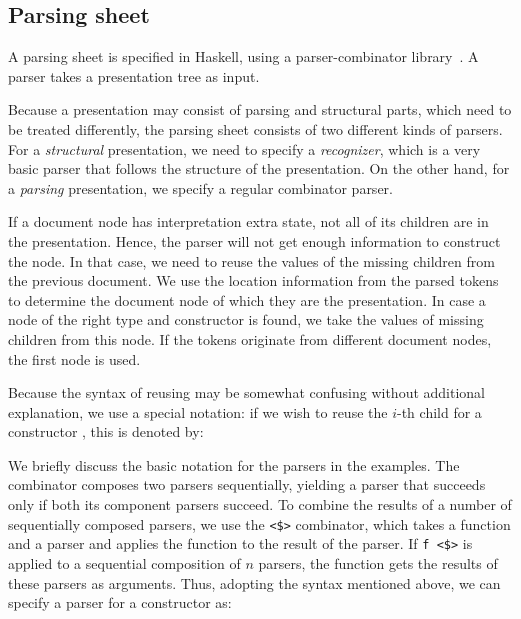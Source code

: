 \subsection{Parsing sheet}

A parsing sheet is specified in Haskell, using a parser-combinator library~\cite{swierstra01parsers}. A parser takes a presentation tree as input.

Because a presentation may consist of parsing and structural parts, which need to be treated differently, the parsing sheet consists of two different kinds of parsers. For a {\em structural} presentation, we need to specify a {\em recognizer}, which is a very basic parser that follows the structure of the presentation. On the other hand, for a {\em parsing} presentation, we specify a regular combinator parser. 

If a document node has interpretation extra state, not all of its children are in the presentation. Hence, the parser will not get enough information to construct the node. In that case, we need to reuse the values of the missing children from the previous document. We use the location information from the parsed tokens to determine the document node of which they are the presentation. In case a node of the right type and constructor is found, we take the values of missing children from this node. If the tokens originate from different document nodes, the first node is used.

Because the syntax of reusing may be somewhat confusing without additional explanation, we use a special notation: if we wish to reuse the $i$-th child for a constructor , this is denoted by:

\begin{small}\end{small}

We briefly discuss the basic notation for the parsers in the examples.  The \p{<*>} combinator composes two parsers sequentially, yielding a parser that succeeds only if both its component parsers succeed. To combine the results of a number of sequentially composed parsers, we use the \verb|<$>|
combinator, which takes a function and a parser and applies the function to the result of the parser. If \verb|f <$>| is applied to a sequential composition of $n$ parsers, the function  gets the results of these parsers as arguments. Thus, adopting the  syntax mentioned above, we can specify a parser for a constructor  as:



